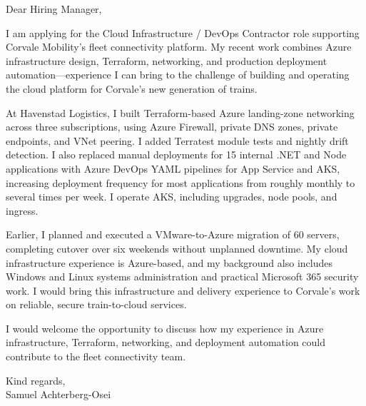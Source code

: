 \documentclass[11pt,a4paper]{article}
\begin{document}
Dear Hiring Manager,

I am applying for the Cloud Infrastructure / DevOps Contractor role supporting Corvale Mobility’s fleet connectivity platform. My recent work combines Azure infrastructure design, Terraform, networking, and production deployment automation—experience I can bring to the challenge of building and operating the cloud platform for Corvale’s new generation of trains.

At Havenstad Logistics, I built Terraform-based Azure landing-zone networking across three subscriptions, using Azure Firewall, private DNS zones, private endpoints, and VNet peering. I added Terratest module tests and nightly drift detection. I also replaced manual deployments for 15 internal .NET and Node applications with Azure DevOps YAML pipelines for App Service and AKS, increasing deployment frequency for most applications from roughly monthly to several times per week. I operate AKS, including upgrades, node pools, and ingress.

Earlier, I planned and executed a VMware-to-Azure migration of 60 servers, completing cutover over six weekends without unplanned downtime. My cloud infrastructure experience is Azure-based, and my background also includes Windows and Linux systems administration and practical Microsoft 365 security work. I would bring this infrastructure and delivery experience to Corvale’s work on reliable, secure train-to-cloud services.

I would welcome the opportunity to discuss how my experience in Azure infrastructure, Terraform, networking, and deployment automation could contribute to the fleet connectivity team.

Kind regards,\\
Samuel Achterberg-Osei
\end{document}
